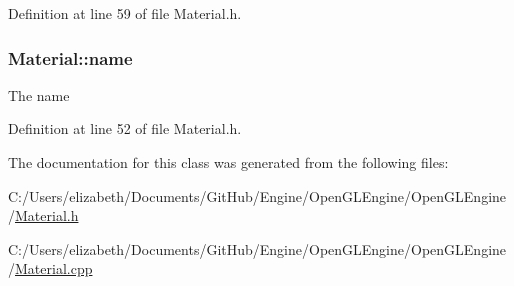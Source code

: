 Definition at line 59 of file Material.\+h.

\subsubsection[{\texorpdfstring{name}{name}}]{ Material\+::name\hspace{0.3cm}{\ttfamily [private]}}\hypertarget{class_material_a988570645fdd4363ca975f5bb4e47205}{}\label{class_material_a988570645fdd4363ca975f5bb4e47205}


The name 



Definition at line 52 of file Material.\+h.



The documentation for this class was generated from the following files\+:\begin{DoxyCompactItemize}
\item 
C\+:/\+Users/elizabeth/\+Documents/\+Git\+Hub/\+Engine/\+Open\+G\+L\+Engine/\+Open\+G\+L\+Engine/\hyperlink{_material_8h}{Material.\+h}\item 
C\+:/\+Users/elizabeth/\+Documents/\+Git\+Hub/\+Engine/\+Open\+G\+L\+Engine/\+Open\+G\+L\+Engine/\hyperlink{_material_8cpp}{Material.\+cpp}\end{DoxyCompactItemize}

